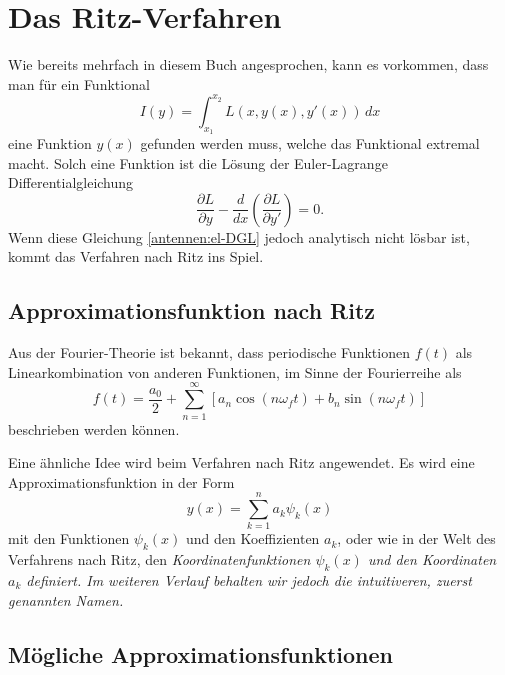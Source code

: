 %
%
% 
%
%

\section{Das Ritz-Verfahren\label{antennen:ritzGrundsätzlich}}

Wie bereits mehrfach in diesem Buch angesprochen, kann es vorkommen, dass man für ein Funktional
\begin{equation}
I(y)
=
\int_{x_1}^{x_2}L(x,y(x),y'(x))\,dx
\label{antennen:normalesFunktional}
\end{equation}
eine Funktion $y(x)$ gefunden werden muss, welche das Funktional extremal macht.
Solch eine Funktion ist die Lösung der Euler-Lagrange Differentialgleichung
\begin{equation}
\frac{\partial L}{\partial y} - \frac{d}{dx} \left( \frac{\partial L}{\partial y'} \right) = 0.
\label{antennen:el-DGL}
\end{equation}
Wenn diese Gleichung \eqref{antennen:el-DGL} 
jedoch analytisch nicht lösbar ist, kommt das Verfahren nach Ritz ins Spiel.

\subsection{Approximationsfunktion nach Ritz\label{antennen:approxFunkt}}

Aus der Fourier-Theorie ist bekannt, dass
periodische Funktionen $f(t)$ als Linearkombination von anderen Funktionen, 
im Sinne der Fourierreihe als
\begin{equation}
f(t)
=
\frac{a_0}{2}+\sum_{n=1}^{\infty}[a_n\cos{(n \omega_f t)}+b_n\sin{(n \omega_f t)}]
\label{antennen:fourier}
\end{equation}
beschrieben werden können.

Eine ähnliche Idee wird beim Verfahren nach Ritz angewendet.
Es wird eine Approximationsfunktion in der Form
\begin{equation}
y(x)=\sum_{k=1}^n a_k \psi_k(x)
\label{antennen:ritzFunkt}
\end{equation}
mit den Funktionen $\psi_k(x)$ und den Koeffizienten $a_k$, oder
wie in der Welt des Verfahrens nach Ritz, den 
\em Koordinatenfunktionen $\psi_k(x)$ \em und den \em Koordinaten \em $a_k$ definiert. 
Im weiteren Verlauf behalten wir jedoch die intuitiveren, zuerst genannten Namen.

\subsection{Mögliche Approximationsfunktionen\label{antennen:approxBsp}}

